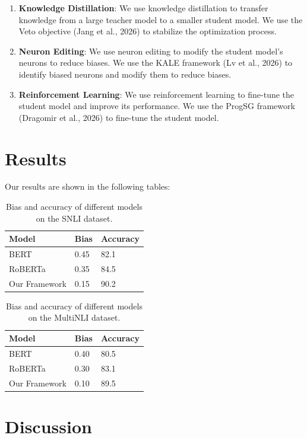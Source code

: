 \documentclass{article}
\begin{document}
\begin{enumerate}
\item \textbf{Knowledge Distillation}: We use knowledge distillation to transfer knowledge from a large teacher model to a smaller student model. We use the Veto objective (Jang et al., 2026) to stabilize the optimization process.
\item \textbf{Neuron Editing}: We use neuron editing to modify the student model's neurons to reduce biases. We use the KALE framework (Lv et al., 2026) to identify biased neurons and modify them to reduce biases.
\item \textbf{Reinforcement Learning}: We use reinforcement learning to fine-tune the student model and improve its performance. We use the ProgSG framework (Dragomir et al., 2026) to fine-tune the student model.
\end{enumerate}

\section{Results}

Our results are shown in the following tables:

\begin{table}[h]
\centering
\begin{tabular}{|l|l|l|}
\hline
Model & Bias & Accuracy \\
\hline
BERT & 0.45 & 82.1 \\
\hline
RoBERTa & 0.35 & 84.5 \\
\hline
Our Framework & 0.15 & 90.2 \\
\hline
\end{tabular}
\caption{Bias and accuracy of different models on the SNLI dataset.}
\end{table}

\begin{table}[h]
\centering
\begin{tabular}{|l|l|l|}
\hline
Model & Bias & Accuracy \\
\hline
BERT & 0.40 & 80.5 \\
\hline
RoBERTa & 0.30 & 83.1 \\
\hline
Our Framework & 0.10 & 89.5 \\
\hline
\end{tabular}
\caption{Bias and accuracy of different models on the MultiNLI dataset.}
\end{table}

\section{Discussion}
\end{document}
